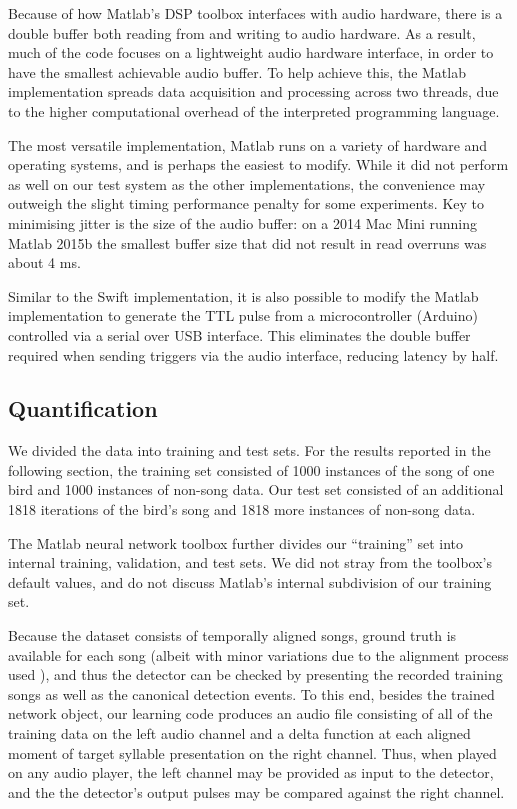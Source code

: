 \documentclass[10pt,letterpaper]{article}
\begin{document}
Because of how Matlab's DSP toolbox interfaces with audio hardware, there is a double buffer both reading from and writing to audio hardware. As a result, much of the code focuses on a lightweight audio hardware interface, in order to have the smallest achievable audio buffer. To help achieve this, the Matlab implementation spreads data acquisition and processing across two threads, due to the higher computational overhead of the interpreted programming language.

The most versatile implementation, Matlab runs on a variety of hardware and operating systems, and is perhaps the easiest to modify.  While it did not perform as well on our test system as the other implementations, the convenience may outweigh the slight timing performance penalty for some experiments.  Key to minimising jitter is the size of the audio buffer: on a 2014 Mac Mini running Matlab 2015b the smallest buffer size that did not result in read overruns was about 4 ms.

Similar to the Swift implementation, it is also possible to modify the Matlab implementation to generate the TTL pulse from a microcontroller (Arduino) controlled via a serial over USB interface. This eliminates the double buffer required when sending triggers via the audio interface, reducing latency by half.

\subsection{Quantification}
\label{sec:quantify}

We divided the data into training and test sets.  For the results reported in the following section, the training set consisted of 1000 instances of the song of one bird and 1000 instances of non-song data.  Our test set consisted of an additional 1818 iterations of the bird's song and 1818 more instances of non-song data.

The Matlab neural network toolbox further divides our ``training'' set into internal training, validation, and test sets.  We did not stray from the toolbox's default values, and do not discuss Matlab's internal subdivision of our training set. %

Because the dataset consists of temporally aligned songs, ground truth is available for each song (albeit with minor variations due to the alignment process used \cite{Poole2012}), and thus the detector can be checked by
presenting the recorded training songs as well as the canonical
detection events. To this end, besides the trained network object, our
learning code produces an audio file consisting of all of the training
data on the left audio channel and a delta function at each aligned moment of
target syllable presentation on the right channel. Thus, when
played on any audio player, the left channel may be provided as input
to the detector, and the the detector's output pulses may be compared against the right channel.
\end{document}
